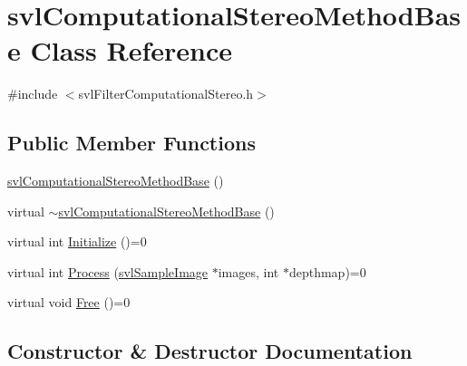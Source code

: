 \hypertarget{classsvl_computational_stereo_method_base}{}\section{svl\+Computational\+Stereo\+Method\+Base Class Reference}
\label{classsvl_computational_stereo_method_base}


{\ttfamily \#include $<$svl\+Filter\+Computational\+Stereo.\+h$>$}

\subsection*{Public Member Functions}
\begin{DoxyCompactItemize}
\item 
\hyperlink{classsvl_computational_stereo_method_base_ad5e9e01929edcf95eda796803e30540a}{svl\+Computational\+Stereo\+Method\+Base} ()
\item 
virtual \hyperlink{classsvl_computational_stereo_method_base_abab381d5badf7c14d8624776136089dd}{$\sim$svl\+Computational\+Stereo\+Method\+Base} ()
\item 
virtual int \hyperlink{classsvl_computational_stereo_method_base_a87f9f845e3f75d4e9793d8ffe08ea661}{Initialize} ()=0
\item 
virtual int \hyperlink{classsvl_computational_stereo_method_base_a4e1e18862a68e97522d2a8d8d54375de}{Process} (\hyperlink{classsvl_sample_image}{svl\+Sample\+Image} $\ast$images, int $\ast$depthmap)=0
\item 
virtual void \hyperlink{classsvl_computational_stereo_method_base_a794421f1857e9f5ece1ee036d6a3fb2f}{Free} ()=0
\end{DoxyCompactItemize}


\subsection{Constructor \& Destructor Documentation}
\hypertarget{classsvl_computational_stereo_method_base_ad5e9e01929edcf95eda796803e30540a}{}
